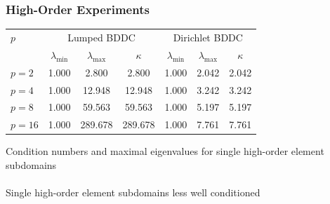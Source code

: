\documentclass{beamer}
\begin{document}
\begin{frame}
\begin{center}
\frametitle{High-Order Experiments}

\begin{table}[ht!]
\begin{center}
\begin{tabular}{l ccc ccc}
  \toprule
  $p$  &  \multicolumn{3}{c}{Lumped BDDC}  &  \multicolumn{3}{c}{Dirichlet BDDC}  \\
                      &  $\lambda_{\min}$  &  $\lambda_{\max}$  &  $\kappa$ & $\lambda_{\min}$  &  $\lambda_{\max}$ & $\kappa$  \\
  \toprule
  $p = 2$   &  1.000  &    2.800  &    2.800  &  1.000  &  2.042  &  2.042  \\
  $p = 4$   &  1.000  &   12.948  &   12.948  &  1.000  &  3.242  &  3.242  \\
  $p = 8$   &  1.000  &   59.563  &   59.563  &  1.000  &  5.197  &  5.197  \\
  $p = 16$  &  1.000  &  289.678  &  289.678  &  1.000  &  7.761  &  7.761  \\
  \bottomrule
\end{tabular}
\end{center}
\label{table:high_order_element_bddc}
\end{table}
{\small Condition numbers and maximal eigenvalues for single high-order element subdomains}\\

~\\

Single high-order element subdomains less well conditioned

\end{center}
\end{frame}

\end{document}
